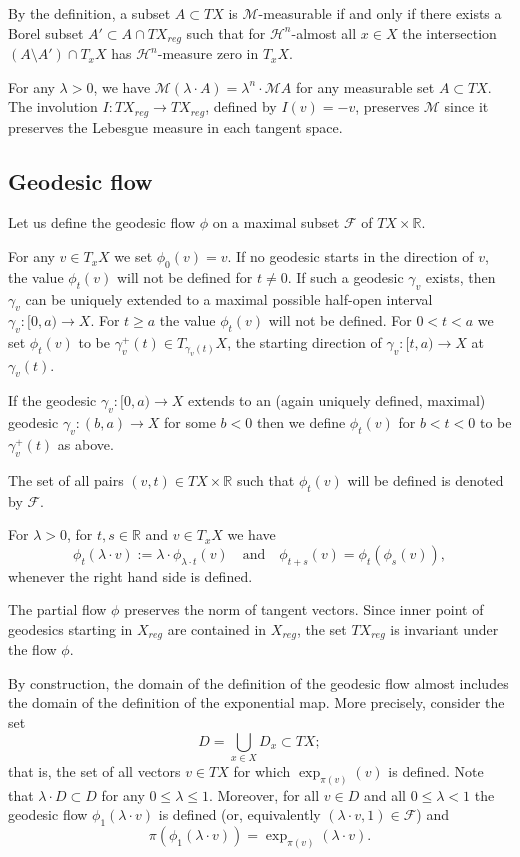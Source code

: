 \documentclass[12pt,leqno,intlimits]{amsart}
\numberwithin{equation}{section}
\theoremstyle{definition}
\theoremstyle{remark}
\newcommand{\R}{\mathbb{R}}
\def\:{\colon}
\begin{document}
By the definition, a subset $A\subset TX$ is $\mathcal M$-measurable if and only if there exists a Borel subset $A'\subset A\cap TX_{reg}$ such that
for $\mathcal H^n$-almost all $x\in X$ the intersection $(A\setminus A') \cap T_xX$ has $\mathcal H^n$-measure zero in $T_xX$.

For any $\lambda>0$, we have $\mathcal M(\lambda\cdot A)=\lambda^n\cdot\mathcal MA$ for any measurable set $A\subset TX$.
The involution $I\:TX_{reg}\to TX_{reg}$, defined by $I(v)=-v$,
preserves $\mathcal M$
since it preserves the Lebesgue measure in each tangent space.


\subsection{Geodesic flow}
Let us define the geodesic flow $\phi$ on a maximal subset $\mathcal F$ of $TX\times\R$.

For any $v\in T_xX$ we set $\phi _0(v)=v$.
If no geodesic starts in the direction of $v$,
the value $\phi _t(v)$ will not be defined for $t\neq 0$. If such a geodesic $\gamma_v$ exists, then $\gamma_v$ can be uniquely extended to a maximal possible half-open interval $\gamma_v \:[0,a)\to X$. For $t\geq a$
the value $\phi _t(v)$ will not be defined. For $0<t<a$ we set $\phi _t(v)$ to be $\gamma _v ^+ (t) \in T_{\gamma _v(t)} X$, the starting direction of $\gamma_v\:[t,a) \to X$ at $\gamma_v (t)$.

If the geodesic $\gamma _v\:[0,a)\to X$ extends to an (again uniquely defined, maximal) geodesic $\gamma_v\:(b,a) \to X$ for some $b<0$
then we define $\phi _t(v)$ for $b<t<0$ to be $\gamma_v ^+ (t) $ as above.

The set of all pairs $(v,t)\in TX\times\R$ such that $\phi_t(v)$ will be defined is denoted by $\mathcal F$.

For $\lambda >0$, for $t,s\in \R$ and $v\in T_x X$ we have
$$\phi _t(\lambda \cdot v) :=\lambda \cdot \phi _{\lambda \cdot t} (v)
\quad\text{and}\quad 
\phi _{t+s} (v) =\phi _t ( \phi _s (v)),$$
whenever the right hand side is defined.

The partial flow $\phi$ preserves the norm of tangent vectors. Since inner point of geodesics starting in $X_{reg}$ are contained in $X_{reg}$, the set $TX_{reg}$ is invariant under the flow $\phi$.

By construction, the domain of the definition of the geodesic flow almost includes the domain of the definition of the exponential map.
More precisely, consider the set
\[D=\bigcup_{x\in X} D_x\subset TX;\]
that is, the set of all vectors $v\in TX$ for which $\exp _{\pi(v)} (v)$ is defined.
Note that $\lambda\cdot D\subset D$ for any $0\leq \lambda \leq 1$.
Moreover, for all $v\in D$ and all $0\leq \lambda <1$
the geodesic flow $\phi_1(\lambda\cdot v)$ is defined (or, equivalently $(\lambda\cdot v,1)\in \mathcal F$) and 
\[\pi(\phi_1 (\lambda\cdot  v))= \exp _{\pi (v)} (\lambda\cdot  v).\]
\end{document}
